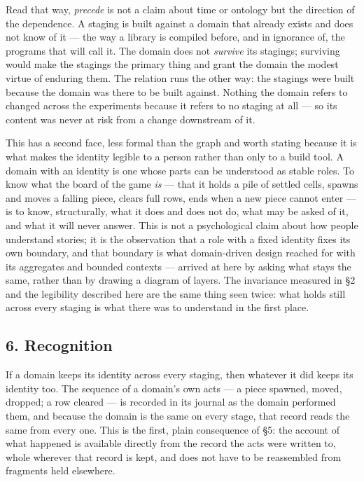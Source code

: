 \documentclass[
]{article}
\begin{document}
Read that way, \emph{precede} is not a claim about time or ontology but
the direction of the dependence. A staging is built against a domain
that already exists and does not know of it --- the way a library is
compiled before, and in ignorance of, the programs that will call it.
The domain does not \emph{survive} its stagings; surviving would make
the stagings the primary thing and grant the domain the modest virtue of
enduring them. The relation runs the other way: the stagings were built
because the domain was there to be built against. Nothing the domain
refers to changed across the experiments because it refers to no staging
at all --- so its content was never at risk from a change downstream of
it.

This has a second face, less formal than the graph and worth stating
because it is what makes the identity legible to a person rather than
only to a build tool. A domain with an identity is one whose parts can
be understood as stable roles. To know what the board of the game
\emph{is} --- that it holds a pile of settled cells, spawns and moves a
falling piece, clears full rows, ends when a new piece cannot enter ---
is to know, structurally, what it does and does not do, what may be
asked of it, and what it will never answer. This is not a psychological
claim about how people understand stories; it is the observation that a
role with a fixed identity fixes its own boundary, and that boundary is
what domain-driven design reached for with its aggregates and bounded
contexts --- arrived at here by asking what stays the same, rather than
by drawing a diagram of layers. The invariance measured in §2 and the
legibility described here are the same thing seen twice: what holds
still across every staging is what there was to understand in the first
place.

\subsection{6. Recognition}\label{recognition}

If a domain keeps its identity across every staging, then whatever it
did keeps its identity too. The sequence of a domain's own acts --- a
piece spawned, moved, dropped; a row cleared --- is recorded in its
journal as the domain performed them, and because the domain is the same
on every stage, that record reads the same from every one. This is the
first, plain consequence of §5: the account of what happened is
available directly from the record the acts were written to, whole
wherever that record is kept, and does not have to be reassembled from
fragments held elsewhere.
\end{document}

